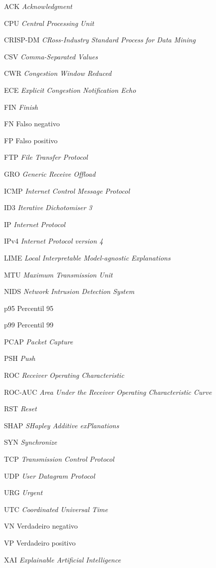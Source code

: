 \documentclass[
  12pt,
  oneside,
  a4paper,
  chapter=TITLE,
  sumario=tradicional,
  english,
  brazil
]{abntex2}
\begin{document}
\begin{siglas}
  \item[ACK] \emph{Acknowledgment}
  \item[CPU] \emph{Central Processing Unit}
  \item[CRISP-DM] \emph{CRoss-Industry Standard Process for Data Mining}
  \item[CSV] \emph{Comma-Separated Values}
  \item[CWR] \emph{Congestion Window Reduced}
  \item[ECE] \emph{Explicit Congestion Notification Echo}
  \item[FIN] \emph{Finish}
  \item[FN] Falso negativo
  \item[FP] Falso positivo
  \item[FTP] \emph{File Transfer Protocol}
  \item[GRO] \emph{Generic Receive Offload}
  \item[ICMP] \emph{Internet Control Message Protocol}
  \item[ID3] \emph{Iterative Dichotomiser 3}
  \item[IP] \emph{Internet Protocol}
  \item[IPv4] \emph{Internet Protocol version 4}
  \item[LIME] \emph{Local Interpretable Model-agnostic Explanations}
  \item[MTU] \emph{Maximum Transmission Unit}
  \item[NIDS] \emph{Network Intrusion Detection System}
  \item[p95] Percentil 95
  \item[p99] Percentil 99
  \item[PCAP] \emph{Packet Capture}
  \item[PSH] \emph{Push}
  \item[ROC] \emph{Receiver Operating Characteristic}
  \item[ROC-AUC] \emph{Area Under the Receiver Operating Characteristic Curve}
  \item[RST] \emph{Reset}
  \item[SHAP] \emph{SHapley Additive exPlanations}
  \item[SYN] \emph{Synchronize}
  \item[TCP] \emph{Transmission Control Protocol}
  \item[UDP] \emph{User Datagram Protocol}
  \item[URG] \emph{Urgent}
  \item[UTC] \emph{Coordinated Universal Time}
  \item[VN] Verdadeiro negativo
  \item[VP] Verdadeiro positivo
  \item[XAI] \emph{Explainable Artificial Intelligence}
\end{siglas}
\end{document}
